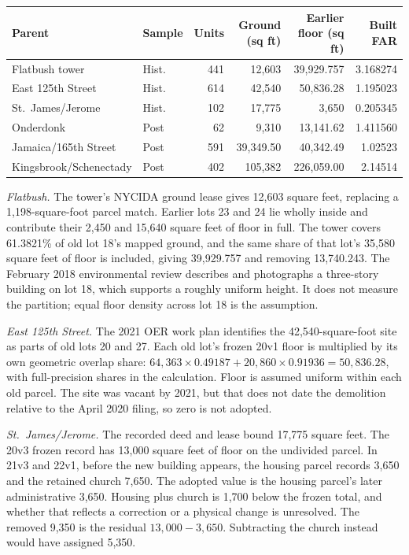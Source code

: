 \begin{center}
\small
\begin{tabular}{llrrrr}
\hline
Parent & Sample & Units & Ground (sq ft) & Earlier floor (sq ft) & Built FAR \\
\hline
Flatbush tower & Hist. & 441 & 12,603 & 39,929.757 & 3.168274 \\
East 125th Street & Hist. & 614 & 42,540 & 50,836.28 & 1.195023 \\
St.~James/Jerome & Hist. & 102 & 17,775 & 3,650 & 0.205345 \\
Onderdonk & Post & 62 & 9,310 & 13,141.62 & 1.411560 \\
Jamaica/165th Street & Post & 591 & 39,349.50 & 40,342.49 & 1.02523 \\
Kingsbrook/Schenectady & Post & 402 & 105,382 & 226,059.00 & 2.14514 \\
\hline
\end{tabular}
\end{center}

\textit{Flatbush.} The tower's NYCIDA ground lease gives 12,603 square feet,
replacing a 1,198-square-foot parcel match. Earlier lots 23 and 24 lie wholly
inside and contribute their 2,450 and 15,640 square feet of floor in full. The
tower covers 61.3821\% of old lot 18's mapped ground, and the same share of
that lot's 35,580 square feet of floor is included, giving 39,929.757 and
removing 13,740.243. The February 2018 environmental review describes and
photographs a three-story building on lot 18, which supports a roughly uniform
height. It does not measure the partition; equal floor density across lot 18
is the assumption.

\textit{East 125th Street.} The 2021 OER work plan identifies the
42,540-square-foot site as parts of old lots 20 and 27. Each old lot's frozen
20v1 floor is multiplied by its own geometric overlap share:
$64{,}363\times0.49187+20{,}860\times0.91936=50{,}836.28$, with full-precision
shares in the calculation. Floor is assumed uniform within each old parcel.
The site was vacant by 2021, but that does not date the demolition relative
to the April 2020 filing, so zero is not adopted.

\textit{St.~James/Jerome.} The recorded deed and lease bound 17,775 square
feet. The 20v3 frozen record has 13,000 square feet of floor on the undivided
parcel. In 21v3 and 22v1, before the new building appears, the housing parcel
records 3,650 and the retained church 7,650. The adopted value is the
housing parcel's later administrative 3,650. Housing plus church is 1,700
below the frozen total, and whether that reflects a correction or a physical
change is unresolved. The removed 9,350 is the residual $13{,}000-3{,}650$.
Subtracting the church instead would have assigned 5,350.

